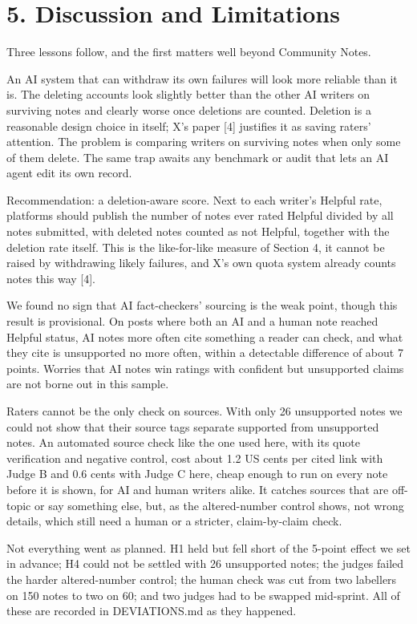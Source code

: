 \documentclass[10.5pt]{article}
\begin{document}
\section*{5. Discussion and Limitations}
Three lessons follow, and the first matters well beyond Community Notes.

An AI system that can withdraw its own failures will look more reliable than it is. The deleting accounts look slightly better than the other AI writers on surviving notes and clearly worse once deletions are counted. Deletion is a reasonable design choice in itself; X's paper [4] justifies it as saving raters' attention. The problem is comparing writers on surviving notes when only some of them delete. The same trap awaits any benchmark or audit that lets an AI agent edit its own record.

Recommendation: a deletion-aware score. Next to each writer's Helpful rate, platforms should publish the number of notes ever rated Helpful divided by all notes submitted, with deleted notes counted as not Helpful, together with the deletion rate itself. This is the like-for-like measure of Section 4, it cannot be raised by withdrawing likely failures, and X's own quota system already counts notes this way [4].

We found no sign that AI fact-checkers' sourcing is the weak point, though this result is provisional. On posts where both an AI and a human note reached Helpful status, AI notes more often cite something a reader can check, and what they cite is unsupported no more often, within a detectable difference of about 7 points. Worries that AI notes win ratings with confident but unsupported claims are not borne out in this sample.

Raters cannot be the only check on sources. With only 26 unsupported notes we could not show that their source tags separate supported from unsupported notes. An automated source check like the one used here, with its quote verification and negative control, cost about 1.2 US cents per cited link with Judge B and 0.6 cents with Judge C here, cheap enough to run on every note before it is shown, for AI and human writers alike. It catches sources that are off-topic or say something else, but, as the altered-number control shows, not wrong details, which still need a human or a stricter, claim-by-claim check.

Not everything went as planned. H1 held but fell short of the 5-point effect we set in advance; H4 could not be settled with 26 unsupported notes; the judges failed the harder altered-number control; the human check was cut from two labellers on 150 notes to two on 60; and two judges had to be swapped mid-sprint. All of these are recorded in DEVIATIONS.md as they happened.
\end{document}
